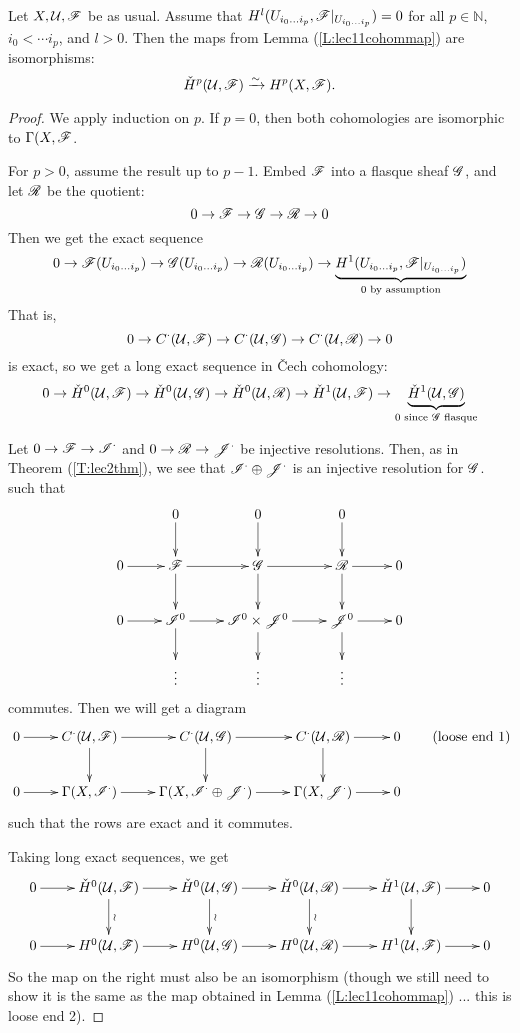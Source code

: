 \begin{theorem} \label{T:lec11}  Let
$X,\mathcal{U},\mathscr{F}$ be as usual. Assume that $H^l(U_{i_0\dots
i_p},\mathscr{F}|_{U_{i_0\dots i_p}})=0$ for all $p\in \mathbb{N}$,
$i_0<\cdots i_p$, and $l>0$.  Then the maps from Lemma
(\ref{L:lec11cohommap}) are isomorphisms:
\[
    \check H^p(\mathcal{U},\mathscr{F}) \xrightarrow{\sim} H^p(X,\mathscr{F}).
\]
\end{theorem}
\begin{proof}
We apply induction on $p$.  If $p=0$, then both cohomologies are
isomorphic to $\Gamma(X,\mathscr{F}$.

For $p>0$, assume the result up to $p-1$.  Embed $\mathscr{F}$ into a
flasque sheaf $\mathscr{G}$, and let $\mathscr{R}$ be the quotient:
\[
    0\to \mathscr{F} \to \mathscr{G} \to \mathscr{R} \to 0
\]
Then we get the exact sequence
\[
    0\to \mathscr{F}(U_{i_0\dots i_p}) \to \mathscr{G}(U_{i_0\dots i_p}) \to \mathscr{R}(U_{i_0\dots
    i_p}) \to \underbrace{H^1(U_{i_0\dots i_p},\mathscr{F}|_{U_{i_0\dots
    i_p}})}_{0\text{ by assumption}}
\]
That is,
\begin{equation}\label{S:lec11seq}
    0\to C^{\cdot}(\mathcal{U},\mathscr{F})\to C^{\cdot}(\mathcal{U},\mathscr{G}) \to C^{\cdot}(\mathcal{U},\mathscr{R}) \to 0
\end{equation}
is exact, so we get a long exact sequence in \v{C}ech cohomology:
\[
    0\to \check H^0(\mathcal{U},\mathscr{F}) \to  \check H^0(\mathcal{U},\mathscr{G}) \to  \check H^0(\mathcal{U},\mathscr{R})
    \to  \check H^1(\mathcal{U},\mathscr{F}) \to  \underbrace{\check H^1(\mathcal{U},\mathscr{G})}_{0\text{ since $\mathscr{G}$ flasque}}
\]

Let $0\to \mathscr{F} \to \mathscr{I}^{\cdot}$ and $0\to \mathscr{R} \to \mathscr{J}^{\cdot}$ be
injective resolutions.  Then, as in Theorem (\ref{T:lec2thm}), we
see that $\mathscr{I}^{\cdot}\oplus \mathscr{J}^{\cdot}$ is an injective resolution
for $\mathscr{G}$. such that
 \[\xymatrix{
 & 0\ar[d] & 0\ar[d] & 0\ar[d]\\
 0\ar[r] &\F\ar[r]\ar[d] & \G\ar[r]\ar[d] & \R\ar[r]\ar[d] & 0\\
 0\ar[r]& \I^0\ar[r]\ar[d] & \I^0\times \J^0 \ar[r] \ar[d] & \J^0 \ar[r]
 \ar[d] & 0\\
 & \vdots & \vdots & \vdots
} \] commutes.  Then we will get a diagram
\[\xymatrix{
 0\ar[r] & C^{\cdot}(\U,\F)\ar[r] \ar[d] & C^{\cdot}(\U,\G) \ar[r] \ar[d] &
 C^{\cdot}(\U,\R) \ar[r] \ar[d] & 0\\
 0\ar[r] & \Gamma(X,\I^{\cdot}) \ar[r] & \Gamma(X,\I^{\cdot}\oplus
 \J^{\cdot}) \ar[r] & \Gamma(X,\J^{\cdot}) \ar[r] & 0
}\tag{loose end 1}\] such that the rows are exact and it commutes.

Taking long exact sequences, we get
\[\xymatrix{
    0\ar[r]& \check H^0(\U,\F) \ar[r] \ar[d]^{\wr} &  \check H^0(\U,\G) \ar[r] \ar[d]^{\wr}
    &  \check H^0(\U,\R) \ar[r] \ar[d]^{\wr} &  \check H^1(\U,\F) \ar[r] \ar[d] &  0 \\
    0\ar[r]& H^0(\U,\F) \ar[r]& H^0(\U,\G) \ar[r]&  H^0(\U,\R)
    \ar[r]& H^1(\U,\F) \ar[r]&  0
}\] So the map on the right must also be an isomorphism (though we
still need to show it is the same as the map obtained in Lemma
(\ref{L:lec11cohommap}) ... this is loose end 2).


\end{proof}
